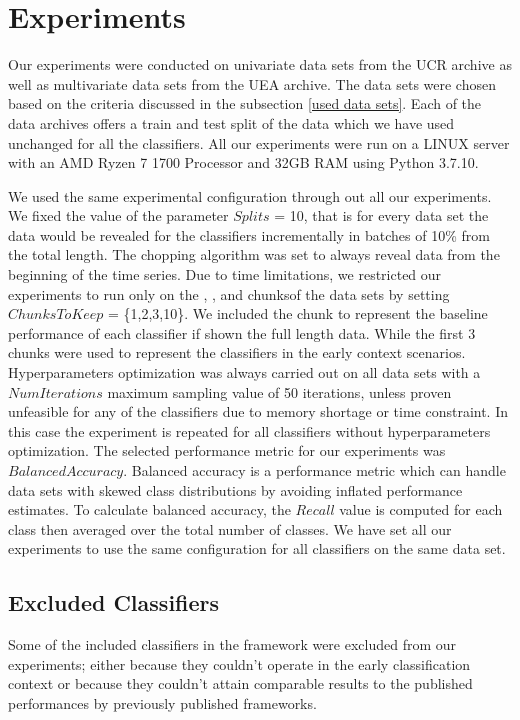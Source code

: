 \section{Experiments}
\label{SectionExperiment}
Our experiments were conducted on univariate data sets from the UCR archive as well as multivariate data sets from the UEA archive.
The data sets were chosen based on the criteria discussed in the subsection \ref{used data sets}.
Each of the data archives offers a train and test split of the data which we have used unchanged for all the classifiers.
All our experiments were run on a LINUX server with an AMD Ryzen 7 1700 Processor and 32GB RAM using Python 3.7.10.

We used the same experimental configuration through out all our experiments.
We fixed the value of the parameter $Splits$ = 10, that is for every data set the data would be revealed for the classifiers incrementally in batches of 10\% from the total length.
The chopping algorithm was set to always reveal data from the beginning of the time series.
Due to time limitations, we restricted our experiments to run only on the , ,  and  chunksof the data sets by setting $ChunksToKeep$ = \{1,2,3,10\}.
We included the  chunk to represent the baseline performance of each classifier if shown the full length data.
While the first 3 chunks were used to represent the classifiers in the early context scenarios.
Hyperparameters optimization was always carried out on all data sets with a $NumIterations$ maximum sampling value of 50 iterations, unless proven unfeasible for any of the classifiers due to memory shortage or time constraint.
In this case the experiment is repeated for all classifiers without hyperparameters optimization.
The selected performance metric for our experiments was $Balanced Accuracy$.
Balanced accuracy is a performance metric which can handle data sets with skewed class distributions by avoiding inflated performance estimates.
To calculate balanced accuracy, the $Recall$ value is computed for each class then averaged over the total number of classes.
We have set all our experiments to use the same configuration for all classifiers on the same data set.


\subsection{Excluded Classifiers}
\label{SubsectionExcludedClassifiers}
Some of the included classifiers in the framework were excluded from our experiments; either because they couldn't operate in the early classification context
or because they couldn't attain comparable results to the published performances by previously published frameworks.

